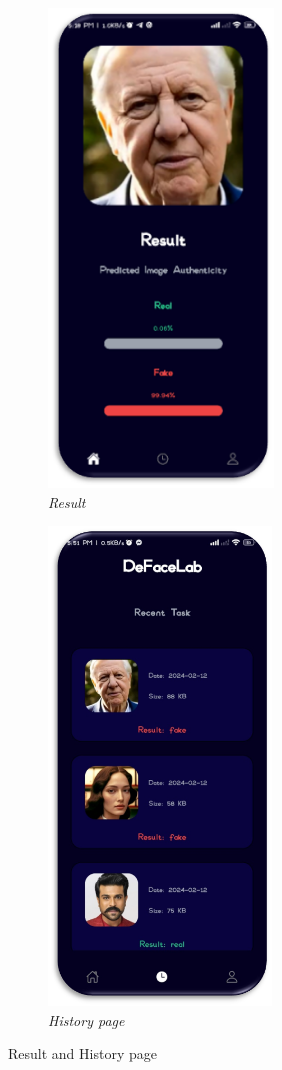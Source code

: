 \begin{figure}[ht]
    \centering
    \begin{subfigure}[b]{0.45\textwidth}
        \centering
        \includegraphics[height=5in]{img/Results.png}
        \caption{\textit{Result}}
    \end{subfigure}
    \hfill
    \begin{subfigure}[b]{0.45\textwidth}
        \centering
        \includegraphics[height=5in]{img/Historyv2.png}
        \caption{\textit{History page}}
    \end{subfigure}
    \caption{Result and History page}
\end{figure}

